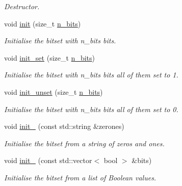 \begin{DoxyCompactItemize}
\begin{DoxyCompactList}\small\item\em Destructor. \end{DoxyCompactList}\item 
void \hyperlink{classlgraph_1_1utils_1_1static__bitset_afad1ede9e08c9d59b641150d2203edca}{init} (size\-\_\-t \hyperlink{classlgraph_1_1utils_1_1static__bitset_aebc02986838d70f13d3c10f390d11211}{n\-\_\-bits})
\begin{DoxyCompactList}\small\item\em Initialise the bitset with {\itshape n\-\_\-bits} bits. \end{DoxyCompactList}\item 
void \hyperlink{classlgraph_1_1utils_1_1static__bitset_a706ac4c15ed634b9087582cacc107acc}{init\-\_\-set} (size\-\_\-t \hyperlink{classlgraph_1_1utils_1_1static__bitset_aebc02986838d70f13d3c10f390d11211}{n\-\_\-bits})
\begin{DoxyCompactList}\small\item\em Initialise the bitset with {\itshape n\-\_\-bits} bits all of them set to 1. \end{DoxyCompactList}\item 
void \hyperlink{classlgraph_1_1utils_1_1static__bitset_a6fb4d66f266593fe9c65451bf6212591}{init\-\_\-unset} (size\-\_\-t \hyperlink{classlgraph_1_1utils_1_1static__bitset_aebc02986838d70f13d3c10f390d11211}{n\-\_\-bits})
\begin{DoxyCompactList}\small\item\em Initialise the bitset with {\itshape n\-\_\-bits} bits all of them set to 0. \end{DoxyCompactList}\item 
void \hyperlink{classlgraph_1_1utils_1_1static__bitset_ab94cca3ec07c19d17a205eb486fc6cdd}{init\-\_} (const std\-::string \&zerones)
\begin{DoxyCompactList}\small\item\em Initialise the bitset from a string of zeros and ones. \end{DoxyCompactList}\item 
void \hyperlink{classlgraph_1_1utils_1_1static__bitset_a223b698841c841d517155f5cdcc1c9a4}{init\-\_} (const std\-::vector$<$ bool $>$ \&bits)
\begin{DoxyCompactList}\small\item\em Initialise the bitset from a list of Boolean values. \end{DoxyCompactList}\item 

\end{DoxyCompactItemize}
